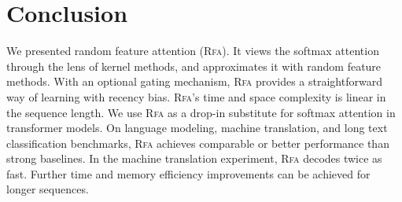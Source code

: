 \section{Conclusion}\label{sec:conclusion}
We presented random feature attention (\textsc{Rfa}).
It views the softmax attention through the lens of kernel methods, and approximates it with  random feature methods. With an optional gating mechanism,
\textsc{Rfa} provides a straightforward way of learning with recency bias.
\textsc{Rfa}'s time and space complexity is linear in the sequence length. We use \textsc{Rfa} as a drop-in substitute for softmax attention in transformer models. On language modeling, machine translation, and long text classification benchmarks,
\textsc{Rfa} achieves comparable or better performance than strong baselines. In the machine translation experiment,
\textsc{Rfa} decodes twice as fast. Further time and memory efficiency improvements can be achieved for longer sequences.


